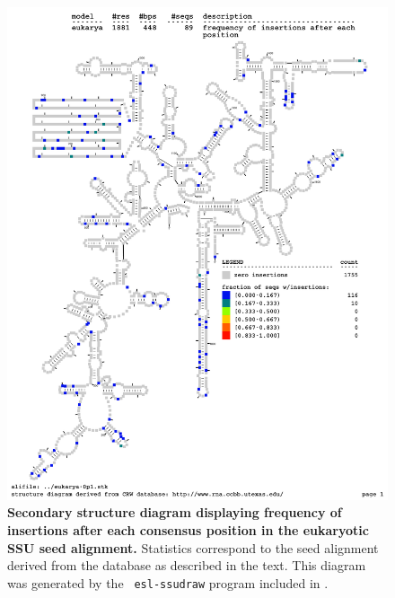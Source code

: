 \begin{figure}
\begin{center}
\includegraphics[width=5.5in]{../../seeds/ss-diagrams/eukarya-0p1-ins}
\end{center}
\caption[Secondary structure diagram displaying frequency of insertions
  after each consensus position in the eukaryotic SSU seed
  alignment]{\textbf{Secondary structure diagram displaying frequency
  of insertions after each consensus position in the eukaryotic SSU seed
  alignment.} Statistics correspond to the  seed
  alignment derived from the  database \cite{CannoneGutell02}
  as described in the text. This diagram was generated by the {\tt
  esl-ssudraw} program included in .}
\label{fig:eukins}
\end{figure}


